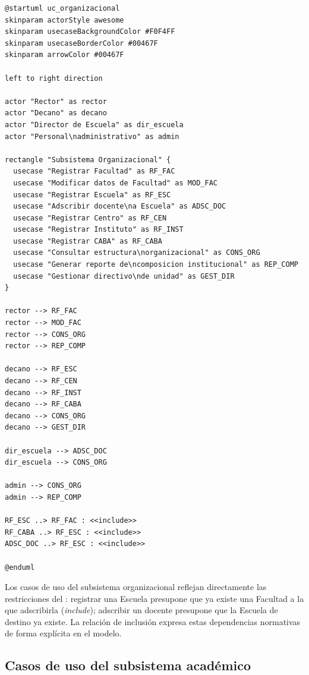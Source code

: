 \begin{lstlisting}[style=plantumlStyle,
  caption={Diagrama de casos de uso del subsistema organizacional (PlantUML).},
  label={lst:plantuml-uc-org}]
@startuml uc_organizacional
skinparam actorStyle awesome
skinparam usecaseBackgroundColor #F0F4FF
skinparam usecaseBorderColor #00467F
skinparam arrowColor #00467F

left to right direction

actor "Rector" as rector
actor "Decano" as decano
actor "Director de Escuela" as dir_escuela
actor "Personal\nadministrativo" as admin

rectangle "Subsistema Organizacional" {
  usecase "Registrar Facultad" as RF_FAC
  usecase "Modificar datos de Facultad" as MOD_FAC
  usecase "Registrar Escuela" as RF_ESC
  usecase "Adscribir docente\na Escuela" as ADSC_DOC
  usecase "Registrar Centro" as RF_CEN
  usecase "Registrar Instituto" as RF_INST
  usecase "Registrar CABA" as RF_CABA
  usecase "Consultar estructura\norganizacional" as CONS_ORG
  usecase "Generar reporte de\ncomposicion institucional" as REP_COMP
  usecase "Gestionar directivo\nde unidad" as GEST_DIR
}

rector --> RF_FAC
rector --> MOD_FAC
rector --> CONS_ORG
rector --> REP_COMP

decano --> RF_ESC
decano --> RF_CEN
decano --> RF_INST
decano --> RF_CABA
decano --> CONS_ORG
decano --> GEST_DIR

dir_escuela --> ADSC_DOC
dir_escuela --> CONS_ORG

admin --> CONS_ORG
admin --> REP_COMP

RF_ESC ..> RF_FAC : <<include>>
RF_CABA ..> RF_ESC : <<include>>
ADSC_DOC ..> RF_ESC : <<include>>

@enduml
\end{lstlisting}

Los casos de uso del subsistema organizacional reflejan directamente las
restricciones del \acuerdo: registrar una Escuela presupone que ya existe
una Facultad a la que adscribirla (\textit{include}); adscribir un docente
presupone que la Escuela de destino ya existe. La relación de inclusión
expresa estas dependencias normativas de forma explícita en el modelo.

\subsection{Casos de uso del subsistema académico}
\label{subsec:uc-academico}

